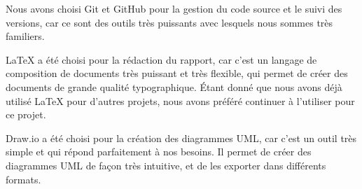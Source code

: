 Nous avons choisi Git et GitHub pour la gestion du code source et le suivi des
versions, car ce sont des outils très puissants avec lesquels nous sommes très
familiers.

LaTeX a été choisi pour la rédaction du rapport, car c'est un langage de
composition de documents très puissant et très flexible, qui permet de créer des
documents de grande qualité typographique.
Étant donné que nous avons déjà utilisé LaTeX pour d'autres projets, nous avons
préféré continuer à l'utiliser pour ce projet.

Draw.io a été choisi pour la création des diagrammes UML, car c'est un outil très
simple et qui répond parfaitement à nos besoins. Il permet de créer des diagrammes
UML de façon très intuitive, et de les exporter dans différents formats.


